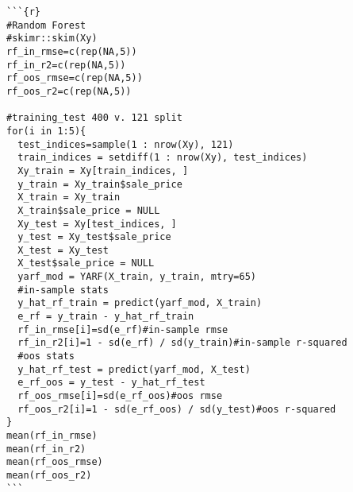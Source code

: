 \documentclass{article}
\begin{document}
\begin{lstlisting}
```{r}
#Random Forest
#skimr::skim(Xy)
rf_in_rmse=c(rep(NA,5))
rf_in_r2=c(rep(NA,5))
rf_oos_rmse=c(rep(NA,5))
rf_oos_r2=c(rep(NA,5))

#training_test 400 v. 121 split
for(i in 1:5){
  test_indices=sample(1 : nrow(Xy), 121)
  train_indices = setdiff(1 : nrow(Xy), test_indices)
  Xy_train = Xy[train_indices, ]
  y_train = Xy_train$sale_price
  X_train = Xy_train
  X_train$sale_price = NULL
  Xy_test = Xy[test_indices, ]
  y_test = Xy_test$sale_price
  X_test = Xy_test
  X_test$sale_price = NULL
  yarf_mod = YARF(X_train, y_train, mtry=65)
  #in-sample stats
  y_hat_rf_train = predict(yarf_mod, X_train)
  e_rf = y_train - y_hat_rf_train
  rf_in_rmse[i]=sd(e_rf)#in-sample rmse
  rf_in_r2[i]=1 - sd(e_rf) / sd(y_train)#in-sample r-squared
  #oos stats
  y_hat_rf_test = predict(yarf_mod, X_test)
  e_rf_oos = y_test - y_hat_rf_test
  rf_oos_rmse[i]=sd(e_rf_oos)#oos rmse
  rf_oos_r2[i]=1 - sd(e_rf_oos) / sd(y_test)#oos r-squared
}
mean(rf_in_rmse)
mean(rf_in_r2)
mean(rf_oos_rmse)
mean(rf_oos_r2)
```
\end{lstlisting}
\end{document}
